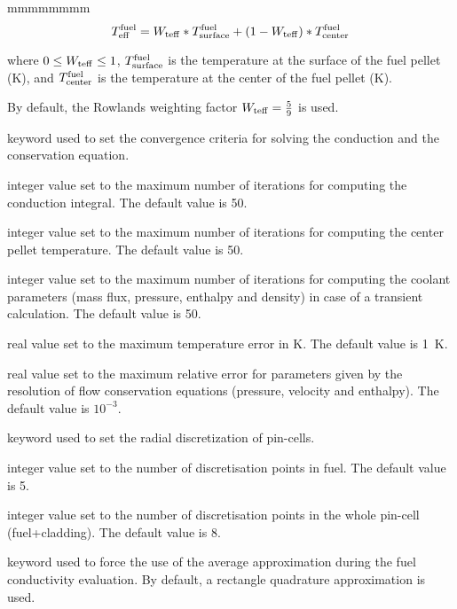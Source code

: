 \begin{ListeDeDescription}{mmmmmmmm}
$$
T^{\rm fuel}_{\rm eff}=W_{\rm teff}*T^{\rm fuel}_{\rm surface}+(1-W_{\rm teff})*T^{\rm fuel}_{\rm center}
$$

where $0\le W_{\rm teff} \le 1$, $T^{\rm fuel}_{\rm surface}$ is the temperature at the surface of the fuel pellet (K), and $T^{\rm fuel}_{\rm center}$ is the temperature at the center of the fuel pellet (K).

By default, the Rowlands weighting factor $W_{\rm teff}={5 \over 9}$ is used\cite{Rowlands}.

\item[\moc{CONV}] keyword used to set the convergence criteria for solving the conduction and the conservation equation.

\item[\dusa{maxit1}] integer value set to the maximum number of iterations for computing the
conduction integral. The default value is 50.

\item[\dusa{maxit2}] integer value set to the maximum number of iterations for computing the
center pellet temperature. The default value is 50.

\item[\dusa{maxit3}] integer value set to the maximum number of iterations for computing the
coolant parameters (mass flux, pressure, enthalpy and density) in case of a transient calculation. The default value is 50.

\item[\dusa{ermaxt}] real value set to the maximum temperature error in K. The default value is 1~K.

\item[\dusa{ermaxc}] real value set to the maximum relative  error for parameters given by the resolution of flow conservation equations (pressure, velocity and enthalpy). The default value is $10^{-3}$.

\item[\moc{RODMESH}] keyword used to set the radial discretization of pin-cells.

\item[\dusa{nb1}] integer value set to the number of discretisation points in fuel. The default value
is 5.

\item[\dusa{nb2}] integer value set to the number of discretisation points in the whole pin-cell (fuel+cladding). The default value
is 8.

\item[\moc{FORCEAVE}] keyword used to force the use of the average approximation during the fuel conductivity evaluation.
By default, a rectangle quadrature approximation is used.


\end{ListeDeDescription}
